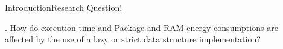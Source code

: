 
    \begin{frame}{Introduction}{Research Question!}


        \RQ{}. How do execution time and Package and RAM energy consumptions are affected by the use of a lazy or strict data structure implementation?


    \end{frame}






